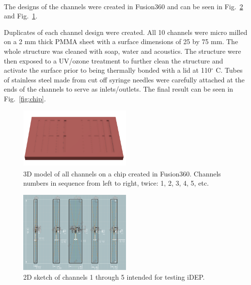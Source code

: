 \documentclass[journal, a4paper]{IEEEtran}
\begin{document}
The designs of the channels were created in Fusion360\textsuperscript{\textregistered} and can be seen in Fig.~\ref{fig:CAD} and Fig.~\ref{fig:CAD3D}.

Duplicates of each channel design were created. All 10 channels were micro milled on a 2 mm thick PMMA sheet with a surface dimensions of 25 by 75 mm. The whole structure was cleaned with soap, water and acoustics. The structure were then exposed to a UV/ozone treatment to further clean the structure and activate the surface prior to being thermally bonded with a lid at 110$^{\circ}$ C. Tubes of stainless steel made from cut off syringe needles were carefully attached at the ends of the channels to serve as inlets/outlets. The final result can be seen in Fig.~\ref{fig:chip}.

\begin{figure}
	\begin{center}
\includegraphics[width=0.5\textwidth]{images/cad3De.png}
		\caption{\label{fig:CAD3D} 3D model of all channels on a chip created in Fusion360\textsuperscript{\textregistered}. Channels numbers in sequence from left to right, twice: 1, 2, 3, 4, 5, etc.}
    \end{center}
\end{figure}

\begin{figure}
\begin{center}
\includegraphics[width=0.5\textwidth]{images/sketch2d.png}
		\caption{\label{fig:CAD} 2D sketch of channels 1 through 5 intended for testing iDEP.}
        \end{center}
\end{figure}
\end{document}
